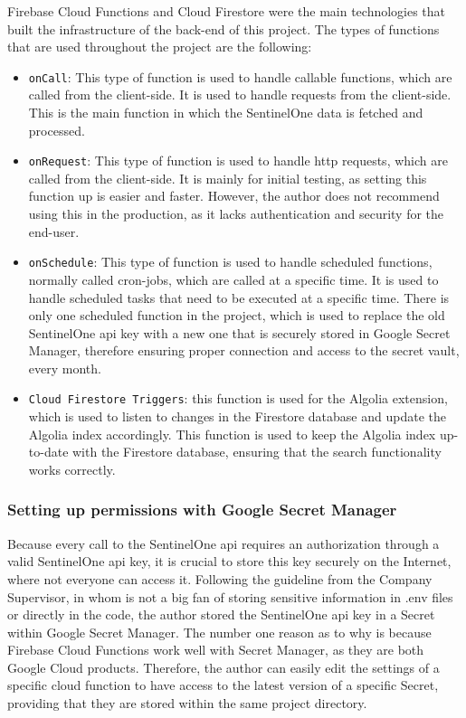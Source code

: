 Firebase Cloud Functions and Cloud Firestore were the main technologies that built the infrastructure of the back-end of this project.
The types of functions that are used throughout the project are the following:
\begin{itemize}
      \item \texttt{onCall}: This type of function is used to handle callable functions, which are called from the client-side. It is used
            to handle requests from the client-side. This is the main function in which the SentinelOne data is fetched and processed.
      \item \texttt{onRequest}: This type of function is used to handle \acrshort{http} requests, which are called from the client-side.
            It is mainly for initial testing, as setting this function up is easier and faster. However, the author does not recommend
            using this in the production, as it lacks authentication and security for the end-user.
      \item \texttt{onSchedule}: This type of function is used to handle scheduled functions, normally called cron-jobs, which are called
            at a specific time. It is used to handle scheduled tasks that need to be executed at a specific time. There is only one
            scheduled function in the project, which is used to replace the old SentinelOne \acrshort{api} key with a new one that is
            securely stored in Google Secret Manager, therefore ensuring proper connection and access to the secret vault, every month.
      \item \texttt{Cloud Firestore Triggers}: this function is used for the Algolia extension, which is used to listen to changes in the
            Firestore database and update the Algolia index accordingly. This function is used to keep the Algolia index up-to-date with
            the Firestore database, ensuring that the search functionality works correctly.
\end{itemize}

\subsubsection{Setting up permissions with Google Secret Manager}

Because every call to the SentinelOne \acrshort{api} requires an authorization through a valid SentinelOne \acrshort{api} key, it is
crucial to store this key securely on the Internet, where not everyone can access it. Following the guideline from the Company
Supervisor, in whom is not a big fan of storing sensitive information in .env files or directly in the code, the author stored the
SentinelOne \acrshort{api} key in a Secret within Google Secret Manager. The number one reason as to why is because Firebase Cloud
Functions work well with Secret Manager, as they are both Google Cloud products. Therefore, the author can easily edit the settings of
a specific cloud function to have access to the latest version of a specific Secret, providing that they are stored within the same
project directory.

